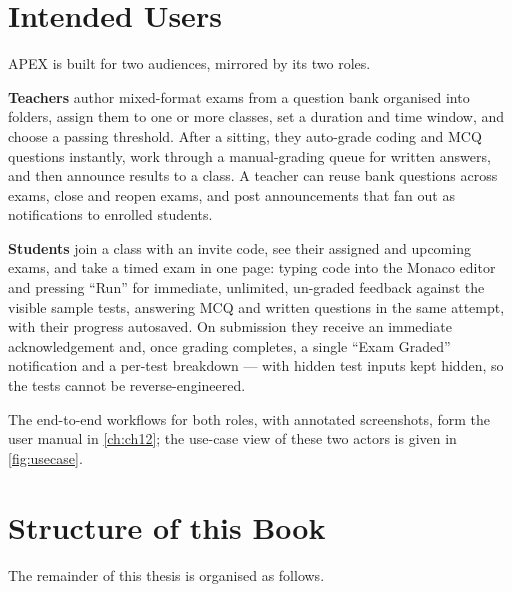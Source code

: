 \section{Intended Users}

APEX is built for two audiences, mirrored by its two roles.

\textbf{Teachers} author mixed-format exams from a question bank organised into
folders, assign them to one or more classes, set a duration and time window,
and choose a passing threshold. After a sitting, they auto-grade coding and MCQ
questions instantly, work through a manual-grading queue for written answers,
and then announce results to a class. A teacher can reuse bank questions across
exams, close and reopen exams, and post announcements that fan out as
notifications to enrolled students.

\textbf{Students} join a class with an invite code, see their assigned and
upcoming exams, and take a timed exam in one page: typing code into the Monaco
editor and pressing ``Run'' for immediate, unlimited, un-graded feedback
against the visible sample tests, answering MCQ and written questions in the
same attempt, with their progress autosaved. On submission they receive an
immediate acknowledgement and, once grading completes, a single ``Exam Graded''
notification and a per-test breakdown --- with hidden test inputs kept
hidden, so the tests cannot be reverse-engineered.

The end-to-end workflows for both roles, with annotated screenshots, form the
user manual in \cref{ch:ch12}; the use-case view of these two actors is given
in \cref{fig:usecase}.

\section{Structure of this Book}

The remainder of this thesis is organised as follows.

